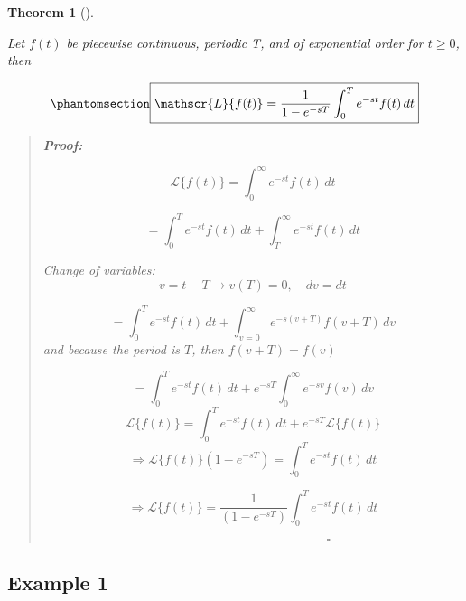 \documentclass[
  letterpaper,
  DIV=11,
  numbers=noendperiod]{scrreprt}
\theoremstyle{plain}
\newtheorem{theorem}{Theorem}[chapter]
\theoremstyle{remark}
\begin{document}
\begin{tcolorbox}[enhanced jigsaw, title=\textcolor{quarto-callout-note-color}{\faInfo}\hspace{0.5em}{Theorem}, colbacktitle=quarto-callout-note-color!10!white, opacitybacktitle=0.6, opacityback=0, rightrule=.15mm, breakable, titlerule=0mm, colback=white, bottomtitle=1mm, colframe=quarto-callout-note-color-frame, toprule=.15mm, leftrule=.75mm, toptitle=1mm, arc=.35mm, bottomrule=.15mm, left=2mm, coltitle=black]

\begin{theorem}[]\protect\hypertarget{thm-pwc}{}\label{thm-pwc}

Let \(f(t)\) be piecewise continuous, periodic T, and of exponential
order for \(t\geq 0\), then

\begin{equation}\phantomsection\label{eq-pwc}{\boxed{\mathscr{L}\{f(t)\}=\frac{1}{1-e^{-sT}}\int_0^T e^{-st}f(t)\,dt}}\end{equation}

\begin{quote}
\textbf{Proof:}

\[\mathscr{L}\{f(t)\}=\int_0^\infty e^{-st} f(t)\,dt\]

\[=\int_0^T e^{-st} f(t)\,dt+\int_T^\infty e^{-st} f(t)\,dt\]

Change of variables: \[v=t-T\rightarrow v(T)=0,\quad dv=dt\]

\[=\int_0^T e^{-st} f(t)\,dt+\int_{v=0}^\infty e^{-s(v+T)} f(v+T)\,dv\]
and because the period is \(T\), then \(f(v+T)=f(v)\)

\[=\int_0^T e^{-st} f(t)\,dt+e^{-sT}\int_0^\infty e^{-sv} f(v)\,dv\]
\[\mathscr{L}\{f(t)\}=\int_0^T e^{-st} f(t)\,dt+e^{-sT}\mathscr{L}\{f(t)\}\]
\[\Rightarrow \mathscr{L}\{f(t)\}\left(1-e^{-sT}\right)=\int_0^T e^{-st} f(t)\,dt\]

\[\Rightarrow \mathscr{L}\{f(t)\}=\frac{1}{\left(1-e^{-sT}\right)}\int_0^T e^{-st} f(t)\,dt\]

\[\hspace{2in}\square\]
\end{quote}

\end{theorem}

\end{tcolorbox}

\subsection{Example 1}\label{example-1-3}
\end{document}

